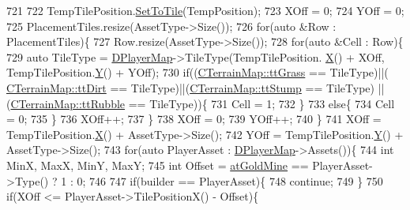 \begin{DoxyCode}
721         
722         TempTilePosition.\hyperlink{classCPosition_ae302aa21792de64c97de29e2cbbfeb94}{SetToTile}(TempPosition);
723         XOff = 0;
724         YOff = 0;
725         PlacementTiles.resize(AssetType->Size());
726         \textcolor{keywordflow}{for}(\textcolor{keyword}{auto} &Row : PlacementTiles)\{
727             Row.resize(AssetType->Size());
728             \textcolor{keywordflow}{for}(\textcolor{keyword}{auto} &Cell : Row)\{
729                 \textcolor{keyword}{auto} TileType = \hyperlink{classCAssetRenderer_a422a3f7e4202e73431fba7036e494dfe}{DPlayerMap}->TileType(TempTilePosition.
      \hyperlink{classCPosition_a9a6b94d3b91df1492d166d9964c865fc}{X}() + XOff, TempTilePosition.\hyperlink{classCPosition_a1aa8a30e2f08dda1f797736ba8c13a87}{Y}() + YOff);
730                 \textcolor{keywordflow}{if}((\hyperlink{classCTerrainMap_aff2ab991e237269941416dd79d8871d4ae587716ed26a437b6ea33f0ac823d47a}{CTerrainMap::ttGrass} == TileType)||(
      \hyperlink{classCTerrainMap_aff2ab991e237269941416dd79d8871d4a49fb754039632e7127fca005dd95bab8}{CTerrainMap::ttDirt} == TileType)||(\hyperlink{classCTerrainMap_aff2ab991e237269941416dd79d8871d4ac6008e344fb024b62741b2ffaef042ef}{CTerrainMap::ttStump} == TileType)
      ||(\hyperlink{classCTerrainMap_aff2ab991e237269941416dd79d8871d4a0969ea4c56acb3f5acf137c0d06a3371}{CTerrainMap::ttRubble} == TileType))\{
731                     Cell = 1;    
732                 \}
733                 \textcolor{keywordflow}{else}\{
734                     Cell = 0;
735                 \}
736                 XOff++;
737             \}
738             XOff = 0;
739             YOff++;
740         \}
741         XOff = TempTilePosition.\hyperlink{classCPosition_a9a6b94d3b91df1492d166d9964c865fc}{X}() + AssetType->Size();
742         YOff = TempTilePosition.\hyperlink{classCPosition_a1aa8a30e2f08dda1f797736ba8c13a87}{Y}() + AssetType->Size();
743         \textcolor{keywordflow}{for}(\textcolor{keyword}{auto} PlayerAsset : \hyperlink{classCAssetRenderer_a422a3f7e4202e73431fba7036e494dfe}{DPlayerMap}->Assets())\{
744             \textcolor{keywordtype}{int} MinX, MaxX, MinY, MaxY;
745             \textcolor{keywordtype}{int} Offset = \hyperlink{GameDataTypes_8h_a5600d4fc433b83300308921974477feca243d9ba44092eadd561db058d742b3b3}{atGoldMine} == PlayerAsset->Type() ? 1 : 0;
746             
747             \textcolor{keywordflow}{if}(builder == PlayerAsset)\{
748                 \textcolor{keywordflow}{continue};   
749             \}
750             \textcolor{keywordflow}{if}(XOff <= PlayerAsset->TilePositionX() - Offset)\{

\end{DoxyCode}
